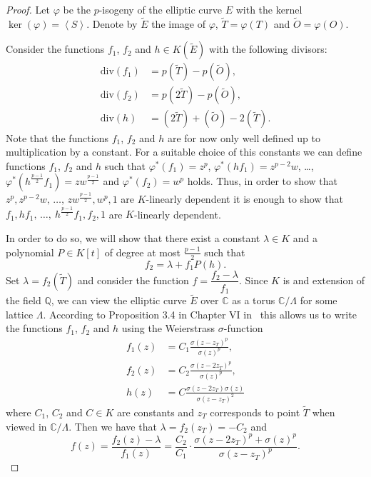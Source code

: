 \documentclass[a4paper, 12pt]{amsart}
\theoremstyle{definition}
\theoremstyle{remark}
\newcommand{\whichbold}[1]{\mathbb{#1}} %
\renewcommand{\div}{\mathrm{div}}
\newcommand{\Q}{\whichbold{Q}}
\newcommand{\C}{\whichbold{C}}
\numberwithin{equation}{section}
\begin{document}
\begin{proof}
    Let $\varphi$ be the $p$-isogeny of the elliptic curve $E$ with the kernel $\ker{(\varphi)}=\left<S\right>$. Denote by $\tilde{E}$ the image of $\varphi$, $\tilde{T}=\varphi(T)$ and $\tilde{O}=\varphi(O)$. 
    
    Consider the functions $f_1$, $f_2$ and $h \in K(\tilde{E})$ with the following divisors:
    \begin{align*}
        \div{(f_1)} &= p(\tilde{T})-p(\tilde{O}),\\
        \div{(f_2)} &= p(2\tilde{T})-p(\tilde{O}),\\
        \div{(h)} &= (2\tilde{T})+(\tilde{O})-2(\tilde{T}).
    \end{align*}
    Note that the functions $f_1$, $f_2$ and $h$ are  for now only well defined up to multiplication by a constant. For a suitable choice of this constants we can define functions $f_1$, $f_2$ and $h$ such that $\varphi^*(f_1)=z^p$, $\varphi^*(hf_1)=z^{p-2}w$, \ldots, $\varphi^*(h^{\frac{p-1}{2}}f_1)=zw^{\frac{p-1}{2}}$ and $\varphi^*(f_2)=w^p$ holds.
    Thus, in order to show that $z^p, z^{p-2}w,\, \dotso ,\, zw^{\frac{p-1}{2}}, w^p, 1$ are $K$-linearly dependent it is enough to show that $f_1, hf_1,\, \dotso,\ h^{\frac{p-1}{2}}f_1, f_2,1$ are $K$-linearly dependent. 
    
    In order to do so, we will show that there exist a constant $\lambda \in K$ and a polynomial $P \in K[t]$ of degree at most $\frac{p-1}{2}$ such that
    \[
        f_2=\lambda+f_1 P(h).
    \] 
    Set $\lambda=f_2(\tilde{T})$ and consider the function $f=\dfrac{f_2-\lambda}{f_1}$. Since $K$ is and extension of the field $\Q$, we can view the elliptic curve $\tilde{E}$ over $\C$ as a torus $\C/\Lambda$ for some lattice $\Lambda$. According to Proposition 3.4 in Chapter VI in~\cite{silverman2009arithmetic} this allows us to write the functions $f_1$, $f_2$ and $h$ using the Weierstrass $\sigma$-function
    \begin{align*}
        f_1(z) &= C_1\frac{\sigma(z-z_T)^p}{\sigma(z)^p},\\
        f_2(z) &= C_2 \frac{\sigma(z-2z_T)^p}{\sigma(z)^p},\\
        h(z) &= C \frac{\sigma(z-2z_T)\sigma(z)}{\sigma(z-z_T)^2}
    \end{align*}
    where $C_1$, $C_2$ and $C \in K$ are constants and $z_T$ corresponds to point $\tilde{T}$ when viewed in $\C/\Lambda$.
    Then we have that $\lambda=f_2(z_T)=-C_2$ and 
    \[
        f(z)=\frac{f_2(z)-\lambda}{f_1(z)}=\frac{C_2}{C_1}\cdot \frac{\sigma(z-2z_T)^p+\sigma(z)^p}{\sigma(z-z_T)^p}.
    \]
    

\end{proof}
\end{document}
